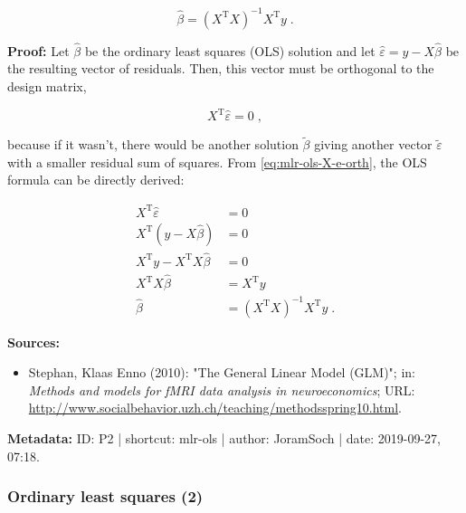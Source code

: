 \documentclass[a4paper,12pt]{book}
\begin{document}
\begin{equation} \label{eq:mlr-ols-OLS}
\hat{\beta} = (X^\mathrm{T} X)^{-1} X^\mathrm{T} y \; .
\end{equation}


\vspace{1em}
\textbf{Proof:} Let $\hat{\beta}$ be the ordinary least squares (OLS) solution and let $\hat{\varepsilon} = y - X\hat{\beta}$ be the resulting vector of residuals. Then, this vector must be orthogonal to the design matrix,

\begin{equation} \label{eq:mlr-ols-X-e-orth}
X^\mathrm{T} \hat{\varepsilon} = 0 \; ,
\end{equation}

because if it wasn't, there would be another solution $\tilde{\beta}$ giving another vector $\tilde{\varepsilon}$ with a smaller residual sum of squares. From \eqref{eq:mlr-ols-X-e-orth}, the OLS formula can be directly derived:

\begin{equation} \label{eq:mlr-ols-OLS-proof}
\begin{split}
X^\mathrm{T} \hat{\varepsilon} &= 0 \\
X^\mathrm{T} \left( y - X\hat{\beta} \right) &= 0 \\
X^\mathrm{T} y - X^\mathrm{T} X\hat{\beta} &= 0 \\
X^\mathrm{T} X\hat{\beta} &= X^\mathrm{T} y \\
\hat{\beta} &= (X^\mathrm{T} X)^{-1} X^\mathrm{T} y \; .
\end{split}
\end{equation}

\vspace{1em}
\textbf{Sources:}
\begin{itemize}
\item Stephan, Klaas Enno (2010): "The General Linear Model (GLM)"; in: \textit{Methods and models for fMRI data analysis in neuroeconomics}; URL: \url{http://www.socialbehavior.uzh.ch/teaching/methodsspring10.html}.
\end{itemize}


\vspace{1em}
\textbf{Metadata:} ID: P2 | shortcut: mlr-ols | author: JoramSoch | date: 2019-09-27, 07:18.


\subsubsection[\textbf{Ordinary least squares (2)}]{Ordinary least squares (2)} \label{sec:mlr-ols2}
\end{document}
